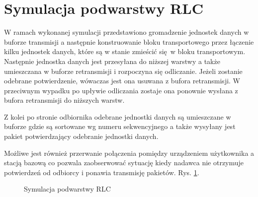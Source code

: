 \section{Symulacja podwarstwy RLC}

W ramach wykonanej symulacji przedstawiono gromadzenie jednostek danych w buforze transmisji a następnie konstruowanie bloku transportowego przez łączenie kilku jednostek danych, które są w stanie zmieścić się w bloku transportowym. Następnie jednostka danych jest przesyłana do niższej warstwy a także umieszczana w buforze retransmisji i rozpoczyna się odliczanie. Jeżeli zostanie odebrane potwierdzenie, wówaczas jest ona usuwana z bufora retransmisji. W przeciwnym wypadku po upływie odliczania zostaje ona ponownie wysłana z bufora retransmisji do niższych warstw.

Z kolei po stronie odbiornika odebrane jednostki danych są umieszczane w buforze gdzie są sortowane wg numeru sekwencyjnego a także wysyłany jest pakiet potwierdzający odebranie jednostki danych.

Możliwe jest również przerwanie połączenia pomiędzy urządzeniem użytkownika a stacją bazową co pozwala zaobserwować sytuację kiedy nadawca nie otrzymuje potwierdzeń od odbiorcy i ponawia transmisję pakietów. Rys. \ref{fig:rlc_simulation}.

\begin{figure}[ht]
	\centerline{}
	\caption{Symulacja podwarstwy RLC}
	\label{fig:rlc_simulation}
\end{figure}

